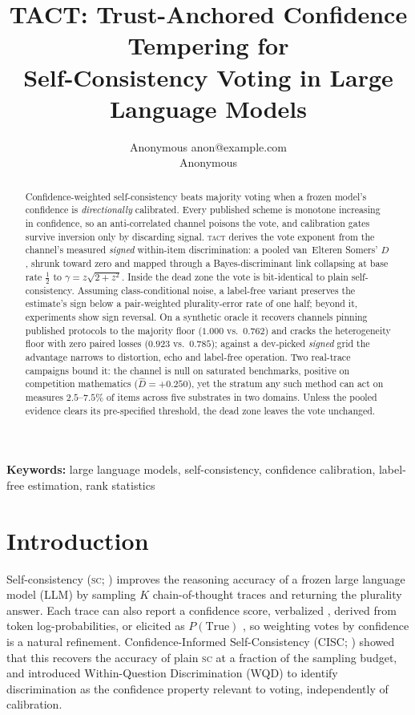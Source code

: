 \documentclass{article}
\title{TACT: Trust-Anchored Confidence Tempering for\\ Self-Consistency Voting
in Large Language Models}
\author{\name Anonymous \email anon@example.com \\ \addr Anonymous}
\newcommand{\Dhat}{\widehat{D}}
\newcommand{\SC}{\textsc{sc}}
\newcommand{\TACT}{\textsc{tact}}
\begin{document}
\maketitle
\begin{abstract}
Confidence-weighted self-consistency beats majority voting when a frozen
model's confidence is \emph{directionally} calibrated. Every published scheme is monotone increasing in confidence, so an
anti-correlated channel poisons the vote, and calibration gates survive
inversion only by discarding signal. \TACT{} derives the vote exponent from the channel's measured
\emph{signed} within-item discrimination: a pooled
van~Elteren Somers' $D$, shrunk toward zero and mapped through a
Bayes-discriminant link collapsing at base rate $\tfrac12$ to
$\gamma=z\sqrt{2+z^2}$. Inside the dead zone the vote is
bit-identical to plain self-consistency. Assuming class-conditional noise, a label-free variant preserves the estimate's sign below a
pair-weighted plurality-error rate of one half; beyond it,
experiments show sign reversal. On a synthetic oracle it recovers channels pinning published protocols to
the majority floor ($1.000$ vs.\ $0.762$) and cracks the
heterogeneity floor with zero paired losses ($0.923$ vs.\ $0.785$); against a
dev-picked \emph{signed} grid the advantage narrows to distortion, echo and
label-free operation. Two real-trace campaigns bound it: the channel is null on saturated
benchmarks, positive on competition mathematics ($\Dhat=+0.250$), yet the
stratum any such method can act on measures $2.5$--$7.5\%$ of items across five
substrates in two domains. Unless the pooled evidence clears its pre-specified threshold, the dead zone
leaves the vote unchanged.
\end{abstract}

\noindent\textbf{Keywords:} 
large language models, self-consistency, confidence calibration, label-free estimation, rank statistics


\section{Introduction}

Self-consistency (\SC; \citealp{wang2023selfconsistency}) improves the reasoning accuracy of a frozen large language model (LLM) by sampling $K$ chain-of-thought traces and returning the plurality answer. Each trace can also report a confidence score, verbalized \citep{tian2023just,xiong2024can}, derived from token log-probabilities, or elicited as $P(\text{True})$ \citep{kadavath2022language}, so weighting votes by confidence is a natural refinement. Confidence-Informed Self-Consistency (CISC; \citealp{taubenfeld2025cisc}) showed that this recovers the accuracy of plain \SC{} at a fraction of the sampling budget, and introduced Within-Question Discrimination (WQD) to identify discrimination as the confidence property relevant to voting, independently of calibration.
\end{document}
